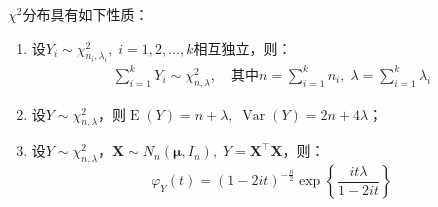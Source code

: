 \begin{property}\label{prop:Chi2Distribution}
	$\chi^2$分布具有如下性质：
	\begin{enumerate}
		\item 设$Y_i\sim\chi_{n_i,\lambda_i}^2,\;i=1,2,\dots,k$相互独立，则：
		\begin{gather*}
			\sum_{i=1}^{k}Y_i\sim\chi_{n,\lambda}^2,\quad\text{其中}
			n=\sum_{i=1}^{k}n_i,\;\lambda=\sum_{i=1}^{k}\lambda_i
		\end{gather*}
		\item 设$Y\sim\chi_{n,\lambda}^2$，则$\operatorname{E}(Y)=n+\lambda,\;\operatorname{Var}(Y)=2n+4\lambda$；
		\item 设$Y\sim\chi_{n,\lambda}^2$，$\mathbf{X}\sim N_n(\boldsymbol{\mu},I_n),\;Y=\mathbf{X}^{\top}\mathbf{X}$，则：
		\begin{equation*}
			\varphi_{Y}(t)=(1-2it)^{-\frac{n}{2}}\exp\left\{\frac{it\lambda}{1-2it}\right\}
		\end{equation*}
	\end{enumerate}
\end{property}
